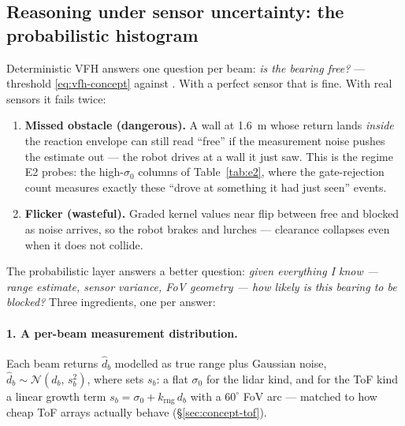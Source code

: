 \subsection{Reasoning under sensor uncertainty: the probabilistic histogram}
\label{sec:concept-unc}

Deterministic VFH answers one question per beam: \emph{is the bearing
free?} --- threshold \eqref{eq:vfh-concept} against . With a
perfect sensor that is fine. With real sensors it fails twice:

\begin{enumerate}[leftmargin=1.9em]
\item \textbf{Missed obstacle (dangerous).} A wall at 1.6~m whose return
lands \emph{inside} the reaction envelope can still read ``free'' if the
measurement noise pushes the estimate out --- the robot drives at a wall it
just saw. This is the regime E2 probes: the high-$\sigma_0$ columns of
Table~\ref{tab:e2}, where the gate-rejection count measures exactly these
``drove at something it had just seen'' events.
\item \textbf{Flicker (wasteful).} Graded kernel values near 
flip between free and blocked as noise arrives, so the robot brakes and
lurches --- clearance collapses even when it does not collide.
\end{enumerate}

The probabilistic layer answers a better question: \emph{given everything I
know --- range estimate, sensor variance, FoV geometry --- how likely is this
bearing to be blocked?} Three ingredients, one per answer:

\paragraph{1. A per-beam measurement distribution.} Each beam returns
$\hat d_b$ modelled as true range plus Gaussian noise, $\hat d_b \sim
\mathcal N(d_b,\, s_b^2)$, where  sets $s_b$: a flat
$\sigma_0$ for the lidar kind, and for the ToF kind a linear growth term
$s_b = \sigma_0 + k_{\mathrm{rng}}\, d_b$ with a $60^\circ$ FoV arc ---
matched to how cheap ToF arrays actually behave (\S\ref{sec:concept-tof}).

